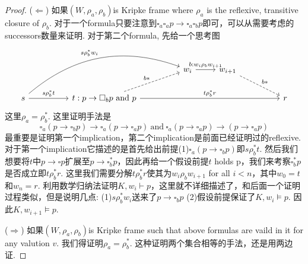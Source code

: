 \documentclass{article}
\theoremstyle{plain}
\theoremstyle{nonumberplain}
\newtheorem{proof}{Proof}
\begin{document}
\begin{proof}
\rm ($\Leftarrow$) 如果$(W, \rho_a, \rho_b)$is Kripke frame where $\rho_a$ is the reflexive, transitive closure of $\rho_b$. 对于一个formula只要注意到$\square_a\square_a p \to \square_a\square_b p$即可，可以从需要考虑的successors数量来证明. 对于第二个formula, 先给一个思考图
$$
\begin{tikzcd}
                                                                    &  &                                                                                            &  & w_{i} \arrow[r, "b:w_i \rho_b w_{i+1}"] & w_{i+1} \arrow[rrd, "b*", dashed] &  &   \\
s \arrow[rr, "s \rho_b^* t"] \arrow[rrrru, "s \rho_b^* w_i", bend left] &  & t:p \to \square_b p ~\text{and}~ p \arrow[rrrrr, "t \rho_b^* r"] \arrow[rru, "b*", dashed] &  &                                         &                                   &  & r
\end{tikzcd}
$$
这里$\rho_a  = \rho_b^*$. 这里证明手法是
$$
\square_a(p \to \square_b p) \to \square_a(p \to \square_a p) ~\text{and}~ \square_a(p \to \square_a p) \to (p \to \square_a p)   
$$
最重要是证明第一个implication，第二个implication是前面已经证明过的reflexive. 对于第一个implication它描述的是首先给出前提(1)$\square_a(p \to \square_b p)$即$s \rho_b^* t$. 然后我们想要将$t$中$p \to \square p$扩展至$p \to \square_b^* p$，因此再给一个假设前提$t$ holds p，我们来考察$\square_b^* p$是否成立即$t \rho_b^* r$. 这里我们需要分解$t \rho_b^* r$使其为$w_i \rho_b w_{i+1}$ for all $i < n$，其中$w_0=t$和$w_{n} = r$. 利用数学归纳法证明$K,w_i \vdash p$，这里就不详细描述了，和后面一个证明过程类似，但是说明几点: (1)$s \rho_b^* w_i$送来了$p \to \square_b p$ (2)假设前提保证了$K,w_i \vDash p$. 因此$K,w_{i+1}\vDash p$. 

($\Rightarrow$) 如果$(W, \rho_a, \rho_b)$is Kripke frame such that above formulas are vaild in it for any valution $v$. 我们得证明$\rho_a = \rho_b^*$. 这种证明两个集合相等的手法，还是用两边证.


\end{proof}
\end{document}

